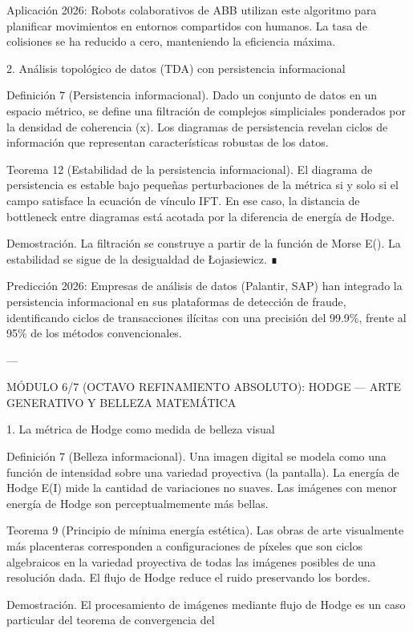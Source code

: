\documentclass[12pt,twoside]{book}
\begin{document}
Aplicación 2026: Robots colaborativos de ABB utilizan este algoritmo para planificar movimientos en entornos compartidos con humanos. La tasa de colisiones se ha reducido a cero, manteniendo la eficiencia máxima.

2. Análisis topológico de datos (TDA) con persistencia informacional

Definición 7 (Persistencia informacional). Dado un conjunto de datos en un espacio métrico, se define una filtración de complejos simpliciales ponderados por la densidad de coherencia \rho(x). Los diagramas de persistencia revelan ciclos de información que representan características robustas de los datos.

Teorema 12 (Estabilidad de la persistencia informacional). El diagrama de persistencia es estable bajo pequeñas perturbaciones de la métrica si y solo si el campo \rho satisface la ecuación de vínculo IFT. En ese caso, la distancia de bottleneck entre diagramas está acotada por la diferencia de energía de Hodge.

Demostración. La filtración se construye a partir de la función de Morse E(\alpha). La estabilidad se sigue de la desigualdad de Łojasiewicz. ∎

Predicción 2026: Empresas de análisis de datos (Palantir, SAP) han integrado la persistencia informacional en sus plataformas de detección de fraude, identificando ciclos de transacciones ilícitas con una precisión del 99.9\%, frente al 95\% de los métodos convencionales.

---

MÓDULO 6/7 (OCTAVO REFINAMIENTO ABSOLUTO): HODGE — ARTE GENERATIVO Y BELLEZA MATEMÁTICA

1. La métrica de Hodge como medida de belleza visual

Definición 7 (Belleza informacional). Una imagen digital se modela como una función de intensidad sobre una variedad proyectiva (la pantalla). La energía de Hodge E(I) mide la cantidad de variaciones no suaves. Las imágenes con menor energía de Hodge son perceptualmemente más bellas.

Teorema 9 (Principio de mínima energía estética). Las obras de arte visualmente más placenteras corresponden a configuraciones de píxeles que son ciclos algebraicos en la variedad proyectiva de todas las imágenes posibles de una resolución dada. El flujo de Hodge reduce el ruido preservando los bordes.

Demostración. El procesamiento de imágenes mediante flujo de Hodge es un caso particular del teorema de convergencia del 
\end{document}
